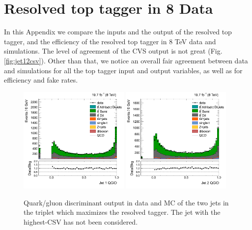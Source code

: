 \section{Resolved top tagger in 8\:\TeV\: Data}
\label{app:8TeV}

In this Appendix we compare the inputs and the output of the resolved top tagger, and the efficiency of the resolved top tagger in 8 TeV data and simulations. The level of agreement of the CVS output is not great (Fig. \ref{fig:jet12csv}). Other than that, we notice an overall fair agreement between data and simulations for all the top tagger input and output variables, as well as for efficiency and fake rates.

\begin{figure}[htbp]
	\centering
	\includegraphics[width=0.48\textwidth]{figures/semilep_1tightmuo_resolved_3ormorejets_2ormorejetWPm_pfmetmore100_pfmtmore40_trigrequestonMC_17102015/res_hJet1qgid.png}
	\includegraphics[width=0.48\textwidth]{figures/semilep_1tightmuo_resolved_3ormorejets_2ormorejetWPm_pfmetmore100_pfmtmore40_trigrequestonMC_17102015/res_hJet2qgid.png}
	\caption{Quark/gluon discriminant output in data and MC of the two jets in the triplet which maximizes the resolved tagger. The jet with the highest-CSV has not been considered.}
	\label{fig:qgid1213TeV}
\end{figure}

